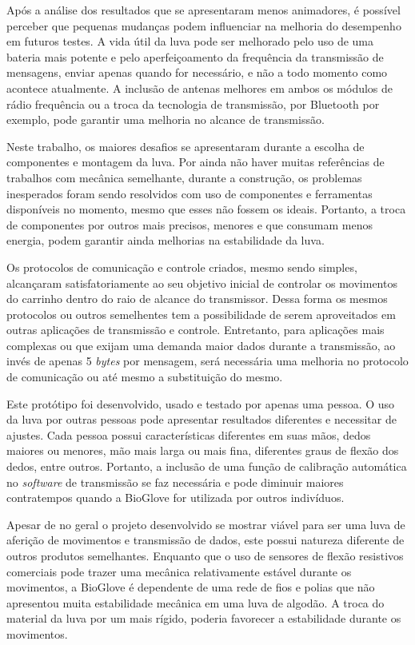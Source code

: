 \documentclass[
	12pt,				%
	openright,			%
	oneside,			%
	a4paper,			%
	english,			%
	brazil				%
	]{abntex2}
\begin{document}
		Após a análise dos resultados que se apresentaram menos animadores, é possível perceber que pequenas mudanças podem influenciar na melhoria do desempenho em futuros testes. A vida útil da luva pode ser melhorado pelo uso de uma bateria mais potente e pelo aperfeiçoamento da frequência da transmissão de mensagens, enviar apenas quando for necessário, e não a todo momento como acontece atualmente. A inclusão de antenas melhores em ambos os módulos de rádio frequência ou a troca da tecnologia de transmissão, por Bluetooth por exemplo, pode garantir uma melhoria no alcance de transmissão.

		Neste trabalho, os maiores desafios se apresentaram durante a escolha de componentes e montagem da luva. Por ainda não haver muitas referências de trabalhos com mecânica semelhante, durante a construção, os problemas inesperados foram sendo resolvidos com uso de componentes e ferramentas disponíveis no momento, mesmo que esses não fossem os ideais. Portanto, a troca de componentes por outros mais precisos, menores e que consumam menos energia, podem garantir ainda melhorias na estabilidade da luva.

		Os protocolos de comunicação e controle criados, mesmo sendo simples, alcançaram satisfatoriamente ao seu objetivo inicial de controlar os movimentos do carrinho dentro do raio de alcance do transmissor. Dessa forma os mesmos protocolos ou outros semelhentes tem a possibilidade de serem aproveitados em outras aplicações de transmissão e controle. Entretanto, para aplicações mais complexas ou que exijam uma demanda maior dados durante a transmissão, ao invés de apenas 5 \textit{bytes} por mensagem, será necessária uma melhoria no protocolo de comunicação ou até mesmo a substituição do mesmo.

		Este protótipo foi desenvolvido, usado e testado por apenas uma pessoa. O uso da luva por outras pessoas pode apresentar resultados diferentes e necessitar de ajustes. Cada pessoa possui características diferentes em suas mãos, dedos maiores ou menores, mão mais larga ou mais fina, diferentes graus de flexão dos dedos, entre outros. Portanto, a inclusão de uma função de calibração automática no \textit{software} de transmissão se faz necessária e pode diminuir maiores contratempos quando a BioGlove for utilizada por outros indivíduos.

		Apesar de no geral o projeto desenvolvido se mostrar viável para ser uma luva de aferição de movimentos e transmissão de dados, este possui natureza diferente de outros produtos semelhantes. Enquanto que o uso de sensores de flexão resistivos comerciais pode trazer uma mecânica relativamente estável durante os movimentos, a BioGlove é dependente de uma rede de fios e polias que não apresentou muita estabilidade mecânica em uma luva de algodão. A troca do material da luva por um  mais rígido, poderia favorecer a estabilidade durante os movimentos.
\end{document}
